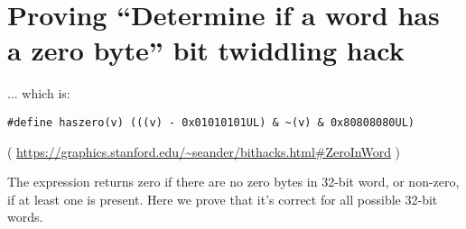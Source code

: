 \section{Proving ``Determine if a word has a zero byte'' bit twiddling hack}

... which is:

\begin{lstlisting}
#define haszero(v) (((v) - 0x01010101UL) & ~(v) & 0x80808080UL)
\end{lstlisting}

( \url{https://graphics.stanford.edu/~seander/bithacks.html#ZeroInWord} )

The expression returns zero if there are no zero bytes in 32-bit word, or non-zero, if at least one is present.
Here we prove that it's correct for all possible 32-bit words.



